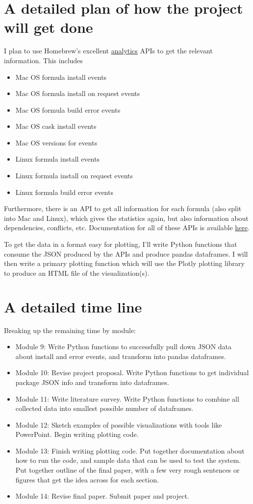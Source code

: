 \documentclass{article}
\begin{document}
\section{A detailed plan of how the project will get done}
I plan to use Homebrew's excellent \href{https://formulae.brew.sh/analytics/}{analytics} APIs to get the relevant information. This includes
\begin{itemize}
    \item Mac OS formula install events 
    \item Mac OS formula install on request events
    \item Mac OS formula build error events
    \item Mac OS cask install events
    \item Mac OS versions for events
    \item Linux formula install events
    \item Linux formula install on request events
    \item Linux formula build error events
\end{itemize}
Furthermore, there is an API to get all information for each formula (also split into Mac and Linux), which gives the statistics again, but also information about dependencies, conflicts, etc. Documentation for all of these APIs is available \href{https://formulae.brew.sh/docs/api/}{here}.

To get the data in a format easy for plotting, I'll write Python functions that consume the JSON produced by the APIs and produce pandas dataframes. I will then write a primary plotting function which will use the Plotly plotting library to produce an HTML file of the visualization(s).

\section{A detailed time line}
Breaking up the remaining time by module:
\begin{itemize}
    \item Module 9: Write Python functions to successfully pull down JSON data about install and error events, and transform into pandas dataframes. 
    \item Module 10: Revise project proposal. Write Python functions to get individual package JSON info and transform into dataframes.
    \item Module 11: Write literature survey. Write Python functions to combine all collected data into smallest possible number of dataframes. 
    \item Module 12: Sketch examples of possible visualizations with tools like PowerPoint. Begin writing plotting code. 
    \item Module 13: Finish writing plotting code. Put together documentation about how to run the code, and sample data that can be used to test the system. Put together outline of the final paper, with a few very rough sentences or figures that get the idea across for each section.
    \item Module 14: Revise final paper. Submit paper and project. 
\end{itemize}
\end{document}
